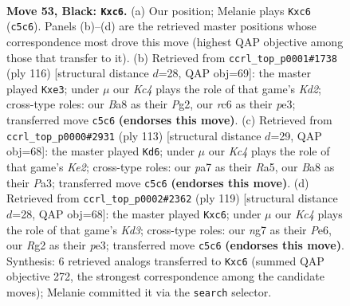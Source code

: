 \documentclass[11pt]{article}
\begin{document}
\clearpage

\begin{figure}[p]\centering
\begin{subfigure}{0.46\textwidth}\centering
\resizebox{\linewidth}{!}{%
\newchessgame
\chessboard[
  setfen={b5K1/P4pNP/2R5/2k1P3/8/8/5pr1/8 b - - 5 53},
  showmover=false,
  pgfstyle=straightmove, color=movearrow, markmove={c5-c6}
]}
\caption{}
\end{subfigure}\hfill
\begin{subfigure}{0.46\textwidth}\centering
\resizebox{\linewidth}{!}{%
\newchessgame
\chessboard[
  setfen={8/PR6/6p1/5k1p/r6P/4p3/3K2P1/8 w - - 0 59},
  showmover=false,
  pgfstyle=straightmove, color=movearrow, markmove={d2-e3}
]}
\caption{}
\end{subfigure}
\\[4pt]
\begin{subfigure}{0.46\textwidth}\centering
\resizebox{\linewidth}{!}{%
\newchessgame
\chessboard[
  setfen={4R3/4kp2/5N2/r5P1/8/p6K/6P1/8 b - - 4 57},
  showmover=false,
  pgfstyle=straightmove, color=movearrow, markmove={e7-d6}
]}
\caption{}
\end{subfigure}\hfill
\begin{subfigure}{0.46\textwidth}\centering
\resizebox{\linewidth}{!}{%
\newchessgame
\chessboard[
  setfen={8/7p/2Rkpb1P/8/2p5/4P1K1/5P2/1B6 b - - 0 60},
  showmover=false,
  pgfstyle=straightmove, color=movearrow, markmove={d6-c6}
]}
\caption{}
\end{subfigure}
\caption{\textbf{Move 53, Black: \texttt{Kxc6}.} (a) Our position; Melanie plays \texttt{Kxc6} (\texttt{c5c6}). Panels (b)--(d) are the retrieved master positions whose correspondence most drove this move (highest QAP objective among those that transfer to it). (b) Retrieved from \texttt{ccrl\_top\_p0001\#1738} (ply 116) [structural distance $d$=28, QAP obj=69]: the master played \texttt{Kxe3}; under $\mu$ our \emph{Kc4} plays the role of that game's \emph{Kd2}; cross-type roles: our \emph{B}a8 as their \emph{P}g2, our \emph{r}c6 as their \emph{p}e3; transferred move \texttt{c5c6} \textbf{(endorses this move)}. (c) Retrieved from \texttt{ccrl\_top\_p0000\#2931} (ply 113) [structural distance $d$=29, QAP obj=68]: the master played \texttt{Kd6}; under $\mu$ our \emph{Kc4} plays the role of that game's \emph{Ke2}; cross-type roles: our \emph{p}a7 as their \emph{R}a5, our \emph{B}a8 as their \emph{P}a3; transferred move \texttt{c5c6} \textbf{(endorses this move)}. (d) Retrieved from \texttt{ccrl\_top\_p0002\#2362} (ply 119) [structural distance $d$=28, QAP obj=68]: the master played \texttt{Kxc6}; under $\mu$ our \emph{Kc4} plays the role of that game's \emph{Kd3}; cross-type roles: our \emph{n}g7 as their \emph{P}e6, our \emph{R}g2 as their \emph{p}e3; transferred move \texttt{c5c6} \textbf{(endorses this move)}. Synthesis: 6 retrieved analogs transferred to \texttt{Kxc6} (summed QAP objective 272, the strongest correspondence among the candidate moves); Melanie committed it via the \texttt{search} selector.}
\label{fig:thought-m105}
\end{figure}
\end{document}
